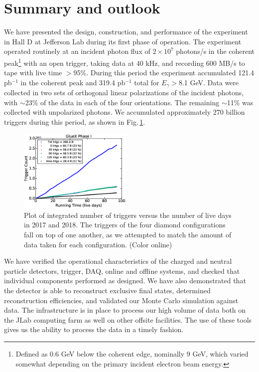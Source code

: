 
\section{Summary and outlook\label{sec:summary} }
We have presented the design, construction, and performance of the \gx{} experiment in Hall D at Jefferson Lab during its first phase of operation. The experiment operated routinely at an incident photon flux of $2\times 10^{7}$ photons/s in the coherent peak\footnote{Defined as 0.6 GeV below the coherent edge, nominally 9 GeV, which varied somewhat depending on the primary incident electron beam energy.} with an open trigger, taking data at 40 kHz, and recording 600 MB/s to tape with live time $>$95\%. During this period the experiment accumulated  121.4 pb$^{-1}$ in the coherent peak and 319.4 pb$^{-1}$ total for $E_\gamma>$8.1 GeV. Data were collected in two sets of orthogonal linear polarizations of the incident photons, with $\sim$23\% of the data in each of the four orientations. The remaining $\sim$11\% was collected with unpolarized photons. We accumulated approximately 270 billion triggers during this period, as shown in Fig.\,\ref{fig:plot_rcdb3_phaseI}.  

\begin{figure}[tbh]\centering
\includegraphics[width=0.48\textwidth]{figures/plot_rcdb3_phaseI.eps}
\caption{\label{fig:plot_rcdb3_phaseI} 
Plot of integrated number of triggers versus the number of live days in 2017 and 2018. The triggers of the four diamond configurations fall on top of one another, as we attempted to match the amount of data taken for each configuration. 
(Color online)
 }
\end{figure}   

We have verified the operational characteristics of the charged and neutral particle detectors, trigger, DAQ, online and offline systems, and checked that individual components performed as designed. We have also demonstrated that the detector is able to reconstruct exclusive final states, determined reconstruction efficiencies, and validated our Monte Carlo simulation against data. The infrastructure is in place to process our high volume of data both on the JLab computing farm as well on other offsite facilities. The use of these tools gives us the ability to process the data in a timely fashion.


